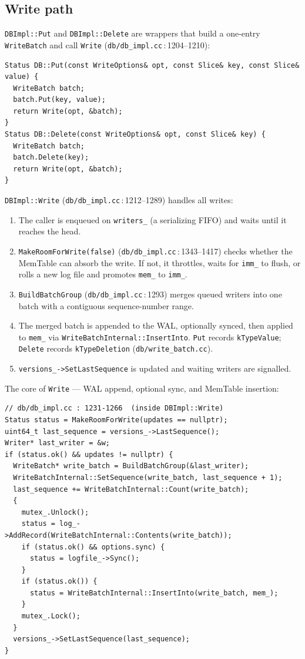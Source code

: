 \documentclass[11pt,a4paper]{article}
\newcommand{\codref}[2]{\textcolor{accent}{\texttt{\small#1}}\,$\!:\!$\textcolor{primary!70!black}{\small#2}}
\newcommand{\fname}[1]{\textcolor{primary!85!black}{\texttt{#1}}}
\newcommand{\sym}[1]{\texttt{#1}}
\begin{document}
\subsection{Write path}

\sym{DBImpl::Put} and \sym{DBImpl::Delete} are wrappers that build a
one-entry \sym{WriteBatch} and call \sym{Write}
(\codref{db/db\_impl.cc}{1204--1210}):

\begin{lstlisting}
Status DB::Put(const WriteOptions& opt, const Slice& key, const Slice& value) {
  WriteBatch batch;
  batch.Put(key, value);
  return Write(opt, &batch);
}
Status DB::Delete(const WriteOptions& opt, const Slice& key) {
  WriteBatch batch;
  batch.Delete(key);
  return Write(opt, &batch);
}
\end{lstlisting}

\sym{DBImpl::Write} (\codref{db/db\_impl.cc}{1212--1289}) handles all writes:
\begin{enumerate}[leftmargin=1.6em,itemsep=2pt]
    \item The caller is enqueued on \sym{writers\_} (a serializing FIFO) and
          waits until it reaches the head.
    \item \sym{MakeRoomForWrite(false)} (\codref{db/db\_impl.cc}{1343--1417})
          checks whether the MemTable can absorb the write. If not, it
          throttles, waits for \sym{imm\_} to flush, or rolls a new log file
          and promotes \sym{mem\_} to \sym{imm\_}.
    \item \sym{BuildBatchGroup} (\codref{db/db\_impl.cc}{1293}) merges
          queued writers into one batch with a contiguous sequence-number range.
    \item The merged batch is appended to the WAL, optionally synced, then
          applied to \sym{mem\_} via \sym{WriteBatchInternal::InsertInto}.
          \sym{Put} records \sym{kTypeValue}; \sym{Delete} records
          \sym{kTypeDeletion} (\fname{db/write\_batch.cc}).
    \item \sym{versions\_->SetLastSequence} is updated and waiting writers
          are signalled.
\end{enumerate}

The core of \fname{Write} --- WAL append, optional sync, and MemTable insertion:

\begin{lstlisting}
// db/db_impl.cc : 1231-1266  (inside DBImpl::Write)
Status status = MakeRoomForWrite(updates == nullptr);
uint64_t last_sequence = versions_->LastSequence();
Writer* last_writer = &w;
if (status.ok() && updates != nullptr) {
  WriteBatch* write_batch = BuildBatchGroup(&last_writer);
  WriteBatchInternal::SetSequence(write_batch, last_sequence + 1);
  last_sequence += WriteBatchInternal::Count(write_batch);
  {
    mutex_.Unlock();
    status = log_->AddRecord(WriteBatchInternal::Contents(write_batch));
    if (status.ok() && options.sync) {
      status = logfile_->Sync();
    }
    if (status.ok()) {
      status = WriteBatchInternal::InsertInto(write_batch, mem_);
    }
    mutex_.Lock();
  }
  versions_->SetLastSequence(last_sequence);
}
\end{lstlisting}
\end{document}
